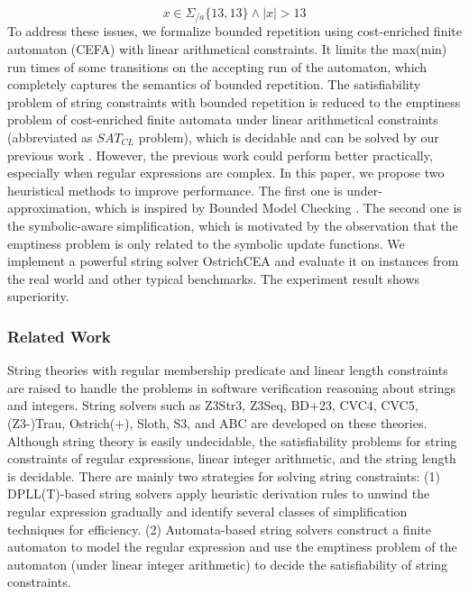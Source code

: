 {\begin{equation}\label{eq:BD+23_timeout}
  x\in \Sigma_{/a}\{13,13\}\wedge |x| > 13
\end{equation}
To address these issues, we formalize bounded repetition using cost-enriched finite automaton (CEFA)\cite{atva2020} with linear arithmetical constraints. It limits the max(min) run times of some transitions on the accepting run of the automaton, which completely captures the semantics of bounded repetition. The satisfiability problem of string constraints with bounded repetition is reduced to the emptiness problem of cost-enriched finite automata under linear arithmetical constraints (abbreviated as $SAT_{CL}$ problem), which is decidable and can be solved by our previous work \cite{atva2020}. However, the previous work could perform better practically, especially when regular expressions are complex. In this paper, we propose two heuristical methods to improve performance. The first one is under-approximation, which is inspired by Bounded Model Checking \cite{bmc_1}\cite{bmc_2}\cite{bmc_3}. The second one is the symbolic-aware simplification, which is motivated by the observation that the emptiness problem is only related to the symbolic update functions. We implement a powerful string solver OstrichCEA and evaluate it on instances from the real world and other typical benchmarks. The experiment result shows superiority.

\subsubsection{Related Work}
String theories with regular membership predicate and linear length constraints are raised to handle the problems in software verification reasoning about strings and integers. String solvers such as Z3Str3\cite{z3str3}, Z3Seq\cite{z3seq}, BD+23\cite{BD+23}, CVC4\cite{cvc4}, CVC5\cite{cvc5}, (Z3-)Trau\cite{trau}\cite{z3trau}, Ostrich(+)\cite{ostrich}\cite{atva2020}, Sloth\cite{sloth}, S3\cite{s3}, and ABC\cite{abc} are developed on these theories. Although string theory is easily
undecidable\cite{undecidable_1}\cite{undecidable_2}, the satisfiability problems for string constraints of regular expressions, linear integer arithmetic, and the string length is decidable\cite{theory_BD+23}. There are mainly two strategies for solving string constraints: (1) DPLL(T)-based\cite{dpll_t} string solvers\cite{z3str3}\cite{cvc5} apply heuristic derivation rules to unwind the regular expression gradually and identify several classes of simplification techniques for efficiency. (2) Automata-based string solvers\cite{trau}\cite{z3trau}\cite{ostrich}\cite{atva2020}\cite{BD+23} construct a finite automaton to model the regular expression and use the emptiness problem of the automaton (under linear integer arithmetic) to decide the satisfiability of string constraints. 


}
